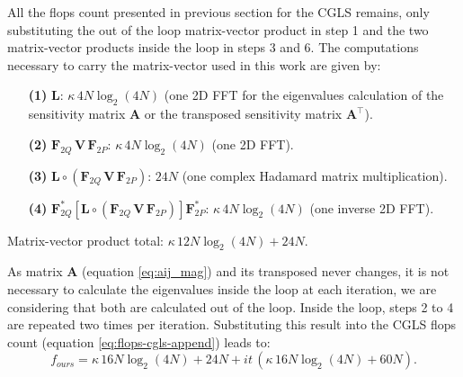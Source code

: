All the flops count presented in previous section for the CGLS remains, only substituting the  out of the loop matrix-vector product in step 1 and the two matrix-vector products inside the loop in steps 3 and 6.
The computations necessary to carry the matrix-vector used in this work are given by:

\begin{itemize}
\item[\textbf{(1)}] $\mathbf{L}$: $\kappa  \, 4 N \log_2(4N)$ (one 2D FFT for the eigenvalues calculation of the sensitivity matrix $\mathbf{A}$ or the transposed sensitivity matrix $\mathbf{A}^{\top}$).

\item[\textbf{(2)}] $\mathbf{F}_{2Q} \, \mathbf{V} \, \mathbf{F}_{2P}$: $\kappa  \, 4 N \log_2(4N)$ (one 2D FFT).

\item[\textbf{(3)}] $\mathbf{L} \circ \left(\mathbf{F}_{2Q} \, \mathbf{V} \, \mathbf{F}_{2P} \right)$: $24 N$ (one complex Hadamard matrix multiplication).

\item[\textbf{(4)}] $\mathbf{F}_{2Q}^{\ast} \left[ 
\mathbf{L} \circ \left(\mathbf{F}_{2Q} \, \mathbf{V} \, \mathbf{F}_{2P} \right) 
\right] \mathbf{F}_{2P}^{\ast}$: $\kappa  \, 4 N \log_2(4N)$ (one inverse 2D FFT).
\end{itemize}
Matrix-vector product total:  $\kappa  \, 12 N \log_2(4 N) + 24 N$.

As matrix $\mathbf{A}$ (equation \ref{eq:aij_mag}) and its transposed never changes, it is not necessary to calculate the eigenvalues inside the loop at each iteration, we are considering that both are calculated out of the loop. Inside the loop, steps 2 to 4 are repeated two times per iteration. Substituting this result into the CGLS flops count (equation \ref{eq:flops-cgls-append}) leads to:
\begin{equation}
f_{ours} =  \kappa  \, 16 N \log_2(4 N) + 24 N + it \, (\kappa  \, 16 N \log_2 (4 N) + 60 N).
\label{eq:flops-cgls-bccb-append}
\end{equation}
